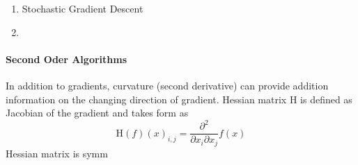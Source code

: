 \begin{enumerate}
    \item Stochastic Gradient Descent \\
    \item \\
\end{enumerate}

\paragraph{Second Oder Algorithms}
In addition to gradients, curvature (second derivative) can provide addition information on the changing direction of gradient. Hessian matrix $\mathrm{H}$ is defined as Jacobian of the gradient and takes form as 
\begin{equation}
    \mathrm{H}(f)(x)_{i,j} = \frac{\partial^2}{\partial x_i \partial x_j}f(x)
\end{equation}
Hessian matrix is symm